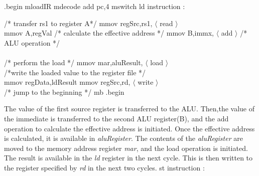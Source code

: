 \begin{ExerciseList}
.begin\newline
mloadIR\newline
mdecode\newline
add pc,4\newline
mswitch\newline
\newline
ld instruction :\newline

/* transfer rs1 to register A*/\newline
mmov regSrc,rs1, $\langle$ read $\rangle$ \\
mmov A,regVal\newline
\newline
/* calculate the effective address */\newline
mmov B,immx, $\langle$ add $\rangle$ /* ALU operation */ \\
\\
/* perform the load */\newline
mmov mar,aluResult, $\langle$ load $\rangle$ \\
\newline
/*write the loaded value to the register file */\\
mmov regData,ldResult\newline
mmov regSrc,rd, $\langle$ write $\rangle$ \\
\newline
/* jump to the beginning */\newline
mb .begin \newline
\newline

The value of the first source register is transferred to the ALU. Then,the value of the immediate is transferred to the second ALU register(B), and the add operation to calculate the effective address is initiated. Once the effective address is calculated, it is available in \textit{aluRegister}. The contents of the \textit{aluRegister} are moved to the memory address register \textit{mar}, and the load operation is initiated. The result is available in the \textit{ld} register in the next cycle. This is then written to the register specified by \textit{rd} in the next two cycles.\newline
\newline
st instruction :
\newline


\end{ExerciseList}
